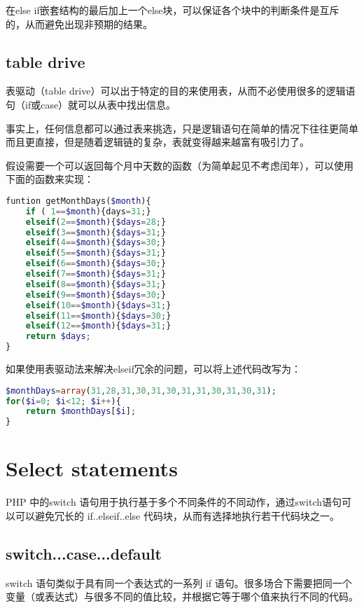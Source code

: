在else if嵌套结构的最后加上一个else块，可以保证各个块中的判断条件是互斥的，从而避免出现非预期的结果。


\subsection{table drive}

表驱动（table drive）可以出于特定的目的来使用表，从而不必使用很多的逻辑语句（if或case）就可以从表中找出信息。

事实上，任何信息都可以通过表来挑选，只是逻辑语句在简单的情况下往往更简单而且更直接，但是随着逻辑链的复杂，表就变得越来越富有吸引力了。

假设需要一个可以返回每个月中天数的函数（为简单起见不考虑闰年），可以使用下面的函数来实现：


\begin{lstlisting}[language=PHP]
funtion getMonthDays($month){
	if ( 1==$month){days=31;}
	elseif(2==$month){$days=28;}
	elseif(3==$month){$days=31;}
	elseif(4==$month){$days=30;}
	elseif(5==$month){$days=31;}
	elseif(6==$month){$days=30;}
	elseif(7==$month){$days=31;}
	elseif(8==$month){$days=31;}
	elseif(9==$month){$days=30;}
	elseif(10==$month){$days=31;}
	elseif(11==$month){$days=30;}
	elseif(12==$month){$days=31;}
	return $days;
}
\end{lstlisting}

如果使用表驱动法来解决elseif冗余的问题，可以将上述代码改写为：


\begin{lstlisting}[language=PHP]
$monthDays=array(31,28,31,30,31,30,31,31,30,31,30,31);
for($i=0; $i<12; $i++){
	return $monthDays[$i];
}
\end{lstlisting}

\section{Select statements}

PHP 中的switch 语句用于执行基于多个不同条件的不同动作，通过switch语句可以可以避免冗长的 if..elseif..else 代码块，从而有选择地执行若干代码块之一。


\subsection{switch...case...default}

switch 语句类似于具有同一个表达式的一系列 if 语句。很多场合下需要把同一个变量（或表达式）与很多不同的值比较，并根据它等于哪个值来执行不同的代码。

